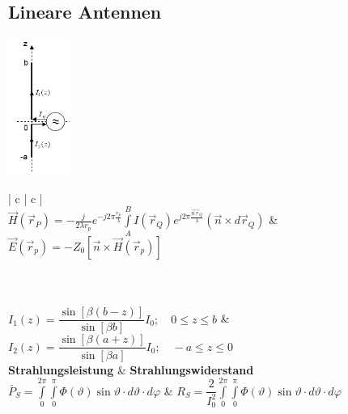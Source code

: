 		
	\subsection{Lineare Antennen}
		\begin{minipage}{2.2cm}
			\includegraphics[height=4.5cm]{./bilder/LinAnt_Stromverteilung.png}
        \end{minipage}
		\begin{minipage}{12.7cm}
		\renewcommand{\arraystretch}{1.6}
		\begin{tabular}{| c | c |}
    		\hline
    	 \\        
    		\hline
    $\vec{H}(\vec{r}_P) = - \frac{j}{2 \lambda r_p} e^{-j 2 \pi \frac{r_p}{\lambda}}     
    \int\limits_A^B I(\vec{r}_Q) e^{j 2 \pi \frac{\vec{n} \vec{r}_Q}{\lambda}} (\vec{n} \times
    d \vec{r}_Q) $
	&
    $ \vec{E}(\vec{r}_p) = - Z_0 \left[ \vec{n} \times \vec{H} (\vec{r}_p) \right] $
    \\
			\hline
    		\hline   
    	\\
    		\hline
     \\
			\hline
    		\hline
    	 \\
    		\hline
    	$ I_1 (z) = \dfrac{\sin{[\beta (b - z)]}}{\sin{[\beta b]}} I_0 ; \quad 0 \leq z \leq
    	b$
    	& 
    	$ I_2 (z) = \dfrac{\sin{[\beta (a + z)]}}{\sin{[\beta a]}} I_0 ; \quad -a \leq z \leq
    	0$ \\
    	
    		\hline
    		\hline
    	\textbf{Strahlungsleistung} & \textbf{Strahlungswiderstand} \\
    		\hline
    	$ \bar{P}_S = \int\limits_0^{2\pi}\int\limits_0^{\pi} \Phi(\vartheta) \sin \vartheta \cdot
    	d \vartheta \cdot d \varphi	$ 
    	& 
    	$ R_S = \dfrac{2}{I_0^2 } \int\limits_0^{2\pi}\int\limits_0^{\pi} \Phi(\vartheta) \sin \vartheta \cdot
    	d \vartheta \cdot d \varphi	$ \\
    		\hline
   		\end{tabular}
		\renewcommand{\arraystretch}{1}
        \end{minipage}		
